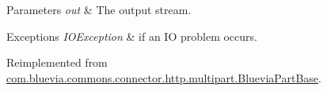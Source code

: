 \begin{DoxyParams}{Parameters}
{\em out} & The output stream. \\
\hline
\end{DoxyParams}

\begin{DoxyExceptions}{Exceptions}
{\em IOException} & if an IO problem occurs. \\
\hline
\end{DoxyExceptions}


Reimplemented from \hyperlink{classcom_1_1bluevia_1_1commons_1_1connector_1_1http_1_1multipart_1_1BlueviaPartBase}{com.bluevia.commons.connector.http.multipart.BlueviaPartBase}.

